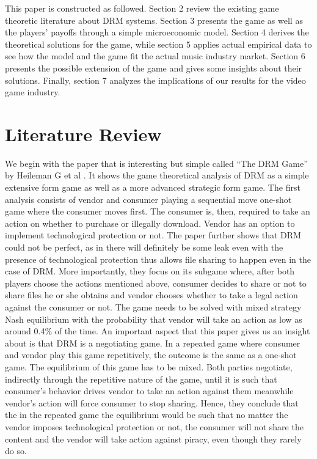 \documentclass[letter,12pt]{article}
\numberwithin{equation}{section}
\begin{document}
This paper is constructed as followed. Section 2 review the existing
game theoretic literature about DRM systems. Section 3 presents the
game as well as the players' payoffs through a simple microeconomic
model. Section 4 derives the theoretical solutions for the game, while
section 5 applies actual empirical data to see how the model and the
game fit the actual music industry market. Section 6 presents the
possible extension of the game and gives some insights about their
solutions. Finally, section 7 analyzes the implications of our results
for the video game industry.

\section{Literature Review}

We begin with the paper that is interesting but simple called ``The DRM Game'' by Heileman G et al \cite{heileman2007}. It shows the game theoretical analysis of DRM as a simple extensive form game as well as a more advanced strategic form game. The first analysis consists of vendor and consumer playing a sequential move one-shot game where the consumer moves first. The consumer is, then, required to take an action on whether to purchase or illegally download. Vendor has an option to implement technological protection or not. The paper further shows that DRM could not be perfect, as in there will definitely be some leak even with the presence of technological protection thus allows file sharing to happen even in the case of DRM. More importantly, they focus on its subgame where, after both players choose the actions mentioned above, consumer decides to share or not to share files he or she obtains and vendor chooses whether to take a legal action against the consumer or not. The game needs to be solved with mixed strategy Nash equilibrium with the probability that vendor will take an action as low as around 0.4\% of the time. An important aspect that this paper gives us an insight about is that DRM is a negotiating game. In a repeated game where consumer and vendor play this game repetitively, the outcome is the same as a one-shot game. The equilibrium of this game has to be mixed. Both parties negotiate, indirectly through the repetitive nature of the game, until it is such that consumer’s behavior drives vendor to take an action against them meanwhile vendor’s action will force consumer to stop sharing. Hence, they conclude that the in the repeated game the equilibrium would be such that no matter the vendor imposes technological protection or not, the consumer will not share the content and the vendor will take action against piracy, even though they rarely do so.\\
\end{document}
